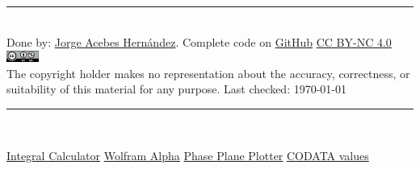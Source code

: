 \hrule
~\\
Done by: \href{https://www.linkedin.com/in/jorge-acebes-hern%C3%A1ndez/}{Jorge Acebes Hernández}. Complete code on \href{https://github.com/JorgeAcebes/Math_For_Physics_CheatSheet}{GitHub} 
\; \; \;\; \href{https://creativecommons.org/licenses/by-nc/4.0/}{CC BY-NC 4.0}
\;\;\;\; \includegraphics[height=1em]{sections/ccbync.png}\\
The copyright holder makes no representation about the accuracy, correctness, or suitability of
this material for any purpose. Last checked: \today
\vfill
\hrule
~\\
\begin{centering}
\href{https://www.integral-calculator.com/}{Integral Calculator} \;\;
\href{https://www.wolframalpha.com/}{Wolfram Alpha}\;\; 
\href{https://aeb019.hosted.uark.edu/pplane.html}{Phase Plane Plotter}\;\;
\href{https://physics.nist.gov/cuu/Constants/index.html}{CODATA values}

\end{centering}




